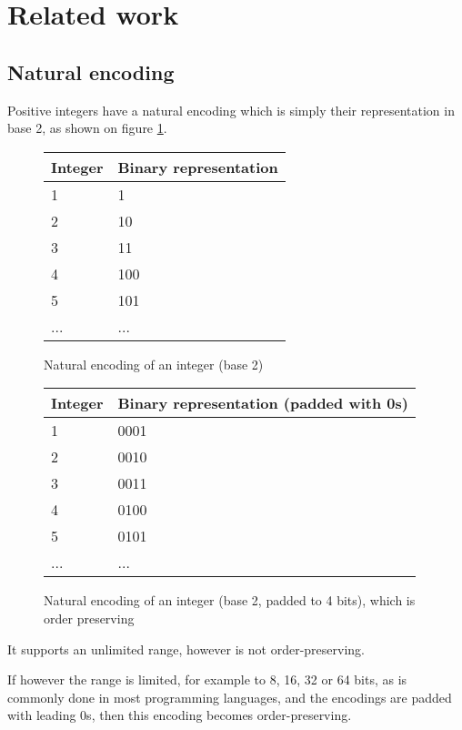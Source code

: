 \documentclass{acm_proc_article-sp}
\begin{document}
\section{Related work}
\label{section-related-work}

\subsection{Natural encoding}

Positive integers have a natural encoding which is simply their representation in base 2, as shown on figure \ref{figure-natural-encoding}.

\begin{figure}
\caption{Natural encoding of an integer (base 2)}
\label{figure-natural-encoding}
\center
\begin{tabular}{|l|l|}
\hline
Integer & Binary representation \\
\hline
1 & 1 \\
\hline
2 & 10 \\
\hline
3 & 11 \\
\hline
4 & 100  \\
\hline
5 & 101  \\
\hline
... & ... \\
\hline
\end{tabular}
\end{figure}

\begin{figure}
\caption{Natural encoding of an integer (base 2, padded to 4 bits), which is order preserving}
\label{figure-natural-encoding-padded}
\center
\begin{tabular}{|l|l|}
\hline
Integer & Binary representation (padded with 0s) \\
\hline
1 & 0001 \\
\hline
2 & 0010 \\
\hline
3 & 0011 \\
\hline
4 & 0100 \\
\hline
5 & 0101 \\
\hline
... & ... \\
\hline
\end{tabular}
\end{figure}

It supports an unlimited range, however is not order-preserving.

If however the range is limited, for example to 8, 16, 32 or 64 bits, as is commonly done in most programming languages, and the encodings are padded with leading 0s, then this encoding becomes order-preserving.
\end{document}
